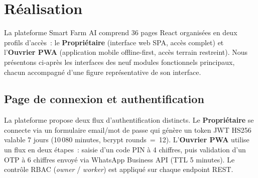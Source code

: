 \section{Réalisation}

La plateforme Smart Farm AI comprend 36 pages React organisées en deux
profils d'accès~: le \textbf{Propriétaire} (interface web SPA, accès complet)
et l'\textbf{Ouvrier PWA} (application mobile offline-first, accès terrain restreint).
Nous présentons ci-après les interfaces des neuf modules fonctionnels principaux,
chacun accompagné d'une figure représentative de son interface.

\subsection{Page de connexion et authentification}

La plateforme propose deux flux d'authentification distincts.
Le \textbf{Propriétaire} se connecte via un formulaire email/mot de passe qui
génère un token JWT HS256 valable 7 jours (10\,080 minutes, bcrypt rounds~=~12).
L'\textbf{Ouvrier PWA} utilise un flux en deux étapes~: saisie d'un code PIN
à 4 chiffres, puis validation d'un OTP à 6 chiffres envoyé via WhatsApp Business
API (TTL 5 minutes). Le contrôle RBAC (\textit{owner} / \textit{worker}) est
appliqué sur chaque endpoint REST.

